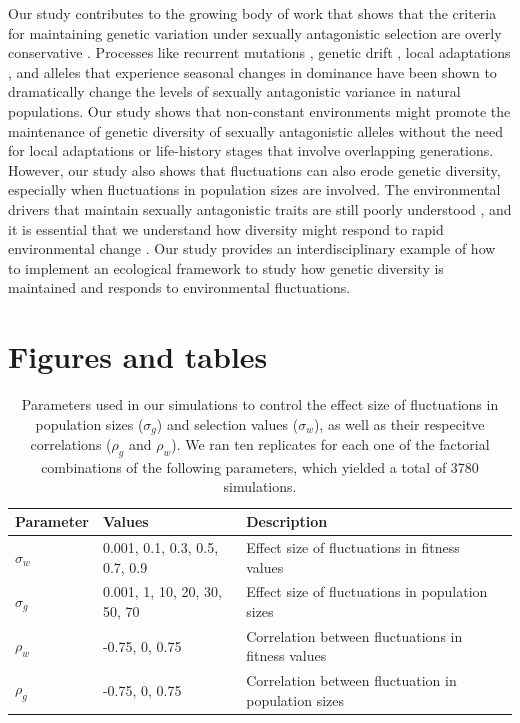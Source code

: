 Our study contributes to the growing body of work that shows that the criteria for maintaining genetic variation under sexually antagonistic selection are overly conservative \citep{connallon2012general,connallon_evolutionary_2018}. Processes like recurrent mutations \citep{radwan_maintenance_2008}, genetic drift \citep{connallon2012general}, local adaptations \citep{connallon_evolutionary_2018}, and alleles that experience seasonal changes in dominance \citep{wittmann2017seasonally} have been shown to dramatically change the levels of sexually antagonistic variance in natural populations. Our study shows that non-constant environments might promote the maintenance of genetic diversity of sexually antagonistic alleles without the need for local adaptations or life-history stages that involve overlapping generations. However, our study also shows that fluctuations can also erode genetic diversity, especially when fluctuations in population sizes are involved. The environmental drivers that maintain sexually antagonistic traits are still poorly understood \citep{connallon2018environmental}, and it is essential that we understand how diversity might respond to rapid environmental change \citep{tylianakis2008global}. Our study provides an interdisciplinary example of how to implement an ecological framework to study how genetic diversity is maintained and responds to environmental fluctuations.
\clearpage
\section*{Figures and tables }


\begin{table}[h]
\fontsize{10}{18}\selectfont
\centering
\caption{Parameters used in our simulations to control the effect size of fluctuations in population sizes ($\sigma_{g}$) and selection values ($\sigma_{w}$), as well as their respecitve correlations ($\rho_{g}$ and $\rho_{w}$). We ran ten replicates for each one  of the factorial combinations of the following parameters, which yielded a total of 3780 simulations. }
\begin{tabular}{@{}llll@{}}
\toprule
Parameter                    & Values                    & Description                                   &  \\ \midrule
$\sigma_{w}$ & 0.001, 0.1, 0.3, 0.5, 0.7, 0.9 & Effect size of fluctuations in fitness values &  \\
$\sigma_{g}$ & 0.001, 1, 10, 20, 30, 50, 70 & Effect size of fluctuations in population sizes                                              &  \\
$\rho_{w}$  &  -0.75, 0, 0.75                         &   Correlation between fluctuations in fitness values                                            &  \\
$\rho_{g}$  &   -0.75, 0, 0.75                        &  Correlation between fluctuation in population sizes                                             &  \\ \bottomrule
\end{tabular}
\label{tab:fluctuations}
\end{table}


